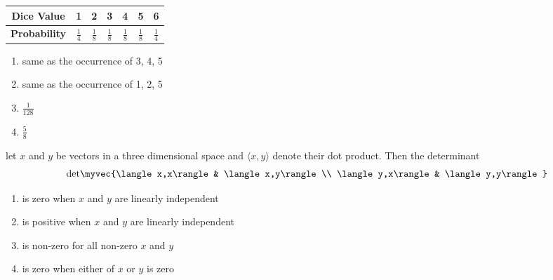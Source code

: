     \begin{table}[h!]    
      \centering
      \begin{tabular}{|c|c|c|c|c|c|c|}
        \hline
        \textbf{Dice Value} & 1 & 2 & 3 & 4 & 5 & 6 \\
        \hline
        \textbf{Probability} & $\frac{1}{4}$ & $\frac{1}{8}$ & $\frac{1}{8}$ & $\frac{1}{8}$ & $\frac{1}{8}$ & $\frac{1}{4}$ \\
        \hline
\end{tabular}
    \end{table}
    \hfill{}
    \begin{enumerate}
        \item same as the occurrence of 3, 4, 5
        \item same as the occurrence of 1, 2, 5
        \item $\frac{1}{128}$
        \item $\frac{5}{8}$
    \end{enumerate}

    \item 
    let $x$ and $y$ be vectors in a three dimensional space and $\langle x,y\rangle$ denote their dot product. Then the determinant 
    \begin{align*}
        \text{det}\myvec{\langle x,x\rangle & \langle x,y\rangle \\ \langle y,x\rangle & \langle y,y\rangle} 
    \end{align*}
    \hfill{}
    \begin{enumerate}
        \item is zero when $x$ and $y$ are linearly independent
        \item is positive when $x$ and $y$ are linearly independent
        \item is non-zero for all  non-zero $x$ and $y$
        \item is zero when either of $x$ or $y$ is zero
    \end{enumerate}

